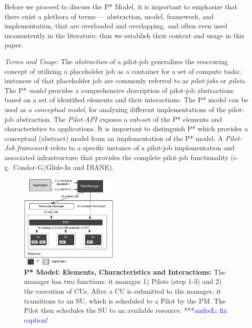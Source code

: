 \documentclass[conference,final]{IEEEtran}
\newcommand{\jhanote}[1]{ {\textcolor{red} { ***shantenu: #1 }}}
\newcommand{\alnote}[1]{ {\textcolor{blue} { ***andreL: #1 }}}
\newcommand{\alnote}[1]{}
\newcommand{\jhanote}[1]{}
\newcommand{\pilot}{Pilot\xspace}
\newcommand{\pilotjob}{Pilot-Job\xspace}
\newcommand{\cu}{CU\xspace}
\newcommand{\cus}{CUs\xspace}
\newcommand{\su}{SU\xspace}
\newcommand{\condorg}{Condor-G/Glide-In\xspace}
\newcommand{\up}{\vspace*{-1em}}
\newcommand{\upp}{\vspace*{-0.5em}}
\begin{document}
Before we proceed to discuss the P* Model, it is important to
emphasize that there exist a plethora of terms --- abstraction, model,
framework, and implementation, that are overloaded and overlapping,
and often even used inconsistently in the literature; thus we
establish their context and usage in this paper.

\emph{Terms and Usage:} The \emph{ abstraction} of a pilot-job
generalizes the reoccuring concept of utilizing a placeholder job as a
container for a set of compute tasks; instances of that placeholder
job are commonly referred to as \emph{pilot-jobs} or
\emph{pilots}. The P* \emph{model} provides a %
comprehensive description of pilot-job abstractions based on a set of
identified elements and their interactions. The P* model can be used
as a {\it conceptual model}, for analyzing different implementations
of the pilot-job abstraction. The \emph{Pilot-API} exposes a sub-set
of the P* elements and characteristics to applications. 
It is important to distinguish P* which provides a conceptual (abstract) model 
from an implementation of the P* model. A \emph{\pilotjob framework} refers to a 
specific instance of a pilot-job implementation and associated infrastructure 
that provides the complete pilot-job functionality (e.\,g.\ \condorg and
DIANE). 



\begin{figure}[t]
    \centering\up
    \includegraphics[width=0.43\textwidth]{figures/pstar_model_single.pdf}
    \caption{ \textbf{P* Model: Elements, Characteristics and
        Interactions:} The manager has two functions: it manages 1)
      Pilots (step 1-3) and 2) the execution of \cus. After a \cu is
      submitted to the manager, it transitions to an \su, which is
      scheduled to a \pilot by the PM. The \pilot then schedules the
      \su to an available resource. \alnote{fix caption!}  \upp\upp}
    \label{fig:figures_pstar}
\end{figure}
\end{document}
